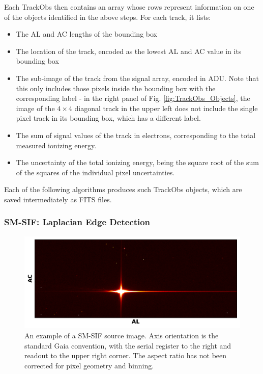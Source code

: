 \documentclass[a4paper, 11pt]{article}
\begin{document}
Each TrackObs then contains an array whose rows represent information on one of the objects identified in the above steps. For each track, it lists:
\begin{itemize}
  \item The AL and AC lengths of the bounding box
  \item The location of the track, encoded as the lowest AL and AC value in its bounding box
  \item The sub-image of the track from the signal array, encoded in ADU. Note that this only includes those pixels inside the bounding box with the corresponding label - in the right panel of Fig. \ref{fig:TrackObs_Objects}, the image of the $4 \times 4$ diagonal track in the upper left does not include the single pixel track in its bounding box, which has a different label.
  \item The sum of signal values of the track in electrons, corresponding to the total measured ionizing energy.
  \item The uncertainty of the total ionizing energy, being the square root of the sum of the squares of the individual pixel uncertainties.
\end{itemize}

Each of the following algorithms produces such TrackObs objects, which are saved intermediately as FITS files.




\subsubsection{SM-SIF: Laplacian Edge Detection}
\label{sec:extrSM-SIF}
\begin{figure}
  \centering
  \includegraphics{images/extraction/SM_full_image}
  \caption{An example of a SM-SIF source image. Axis orientation is the standard Gaia convention, with the serial register to the right and readout to the upper right corner. The aspect ratio has not been corrected for pixel geometry and binning.}
  \label{fig:SM_full}
\end{figure}
\end{document}
